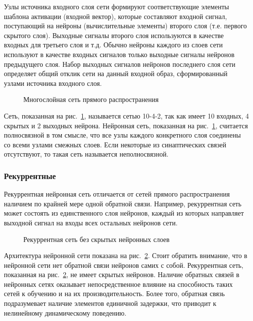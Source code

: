 Узлы источника входного слоя сети формируют соответствующие элементы шаблона активации (входной вектор), которые составляют входной сигнал, поступающий на нейроны (вычислительные элементы) второго слоя (т.е. первого скрытого слоя).
Выходные сигналы второго слоя используются в качестве входных для третьего слоя и т.д.
Обычно нейроны каждого из слоев сети используют в качестве входных сигналов только выходные сигналы нейронов предыдущего слоя.
Набор выходных сигналов нейронов последнего слоя сети определяет общий отклик сети на данный входной образ, сформированный узлами источника входного слоя.

\begin{figure}[h]
\caption{Многослойная сеть прямого распространения}
\label{ris:ManyLayer}
\end{figure}

Сеть, показанная на рис.~\ref{ris:ManyLayer}, называется сетью 10-4-2, так как имеет 10 входных, 4 скрытых и 2 выходных нейрона.
Нейронная сеть, показанная на рис.~\ref{ris:ManyLayer}, считается полносвязной в том смысле, что все узлы каждого конкретного слоя соединены со всеми узлами смежных слоев.
Если некоторые из синаптических связей отсутствуют, то такая сеть называется неполносвязной.\cite{NejronnyeSeti}

\subsubsection{Рекуррентные}
Рекуррентная нейронная сеть отличается от сетей прямого распространения наличием по крайней мере одной обратной связи.
Например, рекуррентная сеть может состоять из единственного слоя нейронов, каждый из которых направляет выходной сигнал на входы всех остальных нейронов сети.

\begin{figure}[h]
\caption{Рекуррентная сеть без скрытых нейронных слоев}
\label{ris:Recurrent}
\end{figure}

Архитектура нейронной сети показана на рис.~\ref{ris:Recurrent}.
Стоит обратить внимание, что в нейронной сети нет обратной связи нейронов самих с собой.
Рекуррентная сеть, показанная на рис.~\ref{ris:Recurrent}, не имеет скрытых нейронов.
Наличие обратных связей в нейронных сетях оказывает непосредственное влияние на способность таких сетей к обучению и на их производительность.
Более того, обратная связь подразумевает наличие элементов единичной задержки, что приводит к нелинейному динамическому поведению.\cite{NejronnyeSeti}